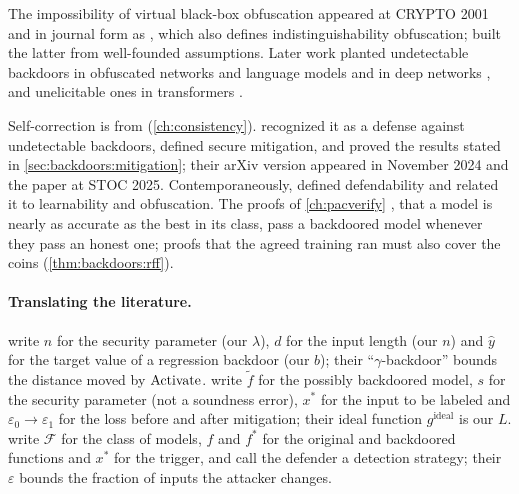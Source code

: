 \begin{refsection}
The impossibility of virtual black-box obfuscation appeared at CRYPTO 2001 and in journal form as \textcite{BarakEtAl2012}, which also defines indistinguishability obfuscation; \textcite{JainLinSahai2021} built the latter from well-founded assumptions. Later work planted undetectable backdoors in obfuscated networks and language models \parencite{KalavasisEtAl2024} and in deep networks \parencite{BogdanovRosenVafa2026}, and unelicitable ones in transformers \parencite{DragunsEtAl2024}.

Self-correction is from \textcite{BlumLubyRubinfeld1993} (\cref{ch:consistency}). \Textcite{GoldwasserEtAl2025} recognized it as a defense against undetectable backdoors, defined secure mitigation, and proved the results stated in \cref{sec:backdoors:mitigation}; their arXiv version appeared in November 2024 and the paper at STOC 2025. Contemporaneously, \textcite{ChristianoEtAl2025} defined defendability and related it to learnability and obfuscation. The proofs of \cref{ch:pacverify} \parencite{GoldwasserEtAl2021}, that a model is nearly as accurate as the best in its class, pass a backdoored model whenever they pass an honest one; proofs that the agreed training ran must also cover the coins (\cref{thm:backdoors:rff}).

\paragraph{Translating the literature.} \Textcite{GoldwasserEtAl2022} write $n$ for the security parameter (our $\lambda$), $d$ for the input length (our $n$) and $\hat y$ for the target value of a regression backdoor (our $b$); their ``$\gamma$-backdoor'' bounds the distance moved by $\mathrm{Activate}$. \Textcite{GoldwasserEtAl2025} write $\tilde f$ for the possibly backdoored model, $s$ for the security parameter (not a soundness error), $x^*$ for the input to be labeled and $\varepsilon_0\to\varepsilon_1$ for the loss before and after mitigation; their ideal function $g^{\mathrm{ideal}}$ is our $L$. \Textcite{ChristianoEtAl2025} write $\mathcal F$ for the class of models, $f$ and $f^*$ for the original and backdoored functions and $x^*$ for the trigger, and call the defender a detection strategy; their $\varepsilon$ bounds the fraction of inputs the attacker changes.

\printchapterbib
\end{refsection}
